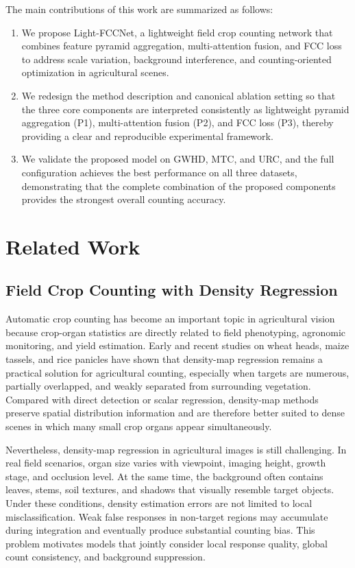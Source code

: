 \documentclass[a4paper,fleqn]{cas-sc}
\begin{document}
The main contributions of this work are summarized as follows:
\begin{enumerate}
    \item We propose Light-FCCNet, a lightweight field crop counting network that combines feature pyramid aggregation, multi-attention fusion, and FCC loss to address scale variation, background interference, and counting-oriented optimization in agricultural scenes.
    \item We redesign the method description and canonical ablation setting so that the three core components are interpreted consistently as lightweight pyramid aggregation (P1), multi-attention fusion (P2), and FCC loss (P3), thereby providing a clear and reproducible experimental framework.
    \item We validate the proposed model on GWHD, MTC, and URC, and the full configuration achieves the best performance on all three datasets, demonstrating that the complete combination of the proposed components provides the strongest overall counting accuracy.
\end{enumerate}

\section{Related Work}

\subsection{Field Crop Counting with Density Regression}

Automatic crop counting has become an important topic in agricultural vision because crop-organ statistics are directly related to field phenotyping, agronomic monitoring, and yield estimation. Early and recent studies on wheat heads, maize tassels, and rice panicles have shown that density-map regression remains a practical solution for agricultural counting, especially when targets are numerous, partially overlapped, and weakly separated from surrounding vegetation. Compared with direct detection or scalar regression, density-map methods preserve spatial distribution information and are therefore better suited to dense scenes in which many small crop organs appear simultaneously.

Nevertheless, density-map regression in agricultural images is still challenging. In real field scenarios, organ size varies with viewpoint, imaging height, growth stage, and occlusion level. At the same time, the background often contains leaves, stems, soil textures, and shadows that visually resemble target objects. Under these conditions, density estimation errors are not limited to local misclassification. Weak false responses in non-target regions may accumulate during integration and eventually produce substantial counting bias. This problem motivates models that jointly consider local response quality, global count consistency, and background suppression.
\end{document}
